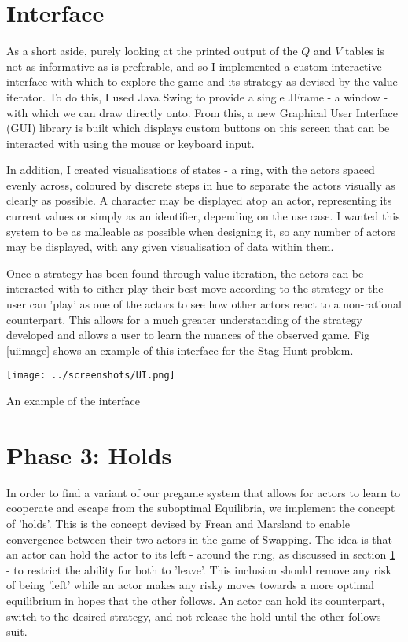 \section{Interface}\label{interface}

As a short aside, purely looking at the printed output of the $Q$ and $V$ tables is not as informative as is preferable, and so I implemented a custom interactive interface with which to explore the game and its strategy as devised by the value iterator. To do this, I used Java Swing to provide a single JFrame - a window - with which we can draw directly onto. From this, a new Graphical User Interface (GUI) library is built which displays custom buttons on this screen that can be interacted with using the mouse or keyboard input.

In addition, I created visualisations of states - a ring, with the actors spaced evenly across, coloured by discrete steps in hue to separate the actors visually as clearly as possible. A character may be displayed atop an actor, representing its current values or simply as an identifier, depending on the use case. I wanted this system to be as malleable as possible when designing it, so any number of actors may be displayed, with any given visualisation of data within them. 

Once a strategy has been found through value iteration, the actors can be interacted with to either play their best move according to the strategy or the user can 'play' as one of the actors to see how other actors react to a non-rational counterpart. This allows for a much greater understanding of the strategy developed and allows a user to learn the nuances of the observed game. Fig \ref{uiimage} shows an example of this interface for the Stag Hunt problem.

\begin{fig}[H]
  \begin{minipage}[b]{1.0\linewidth}
    \centering
    \centerline{\texttt{[image: ../screenshots/UI.png]}}
    \caption{An example of the interface}\medskip\label{uiimage}
  \end{minipage}
\end{fig}

\section{Phase 3: Holds}

In order to find a variant of our pregame system that allows for actors to learn to cooperate and escape from the suboptimal Equilibria, we implement the concept of 'holds'. This is the concept devised by Frean and Marsland \cite{frean2022holds} to enable convergence between their two actors in the game of Swapping. The idea is that an actor can hold the actor to its left - around the ring, as discussed in section \ref{interface} - to restrict the ability for both to 'leave'. This inclusion should remove any risk of being 'left' while an actor makes any risky moves towards a more optimal equilibrium in hopes that the other follows. An actor can hold its counterpart, switch to the desired strategy, and not release the hold until the other follows suit.

